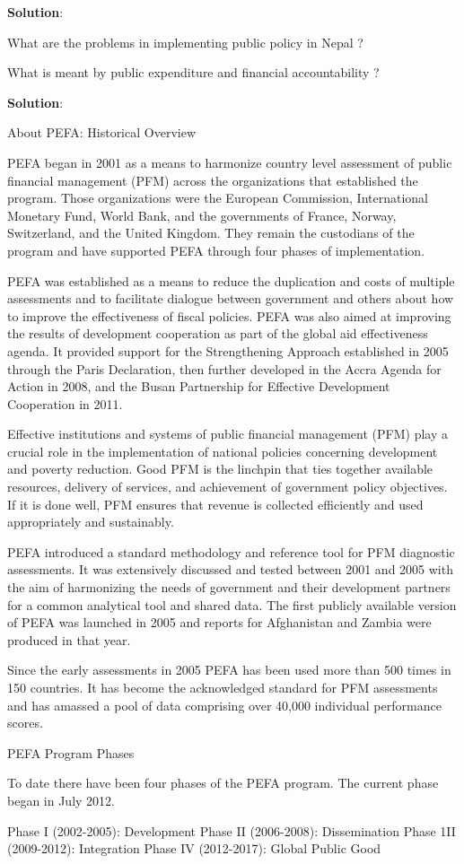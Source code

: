 \documentclass[
  openany]{book}
\newcommand{\question}{\item}
\newenvironment{solution}{ {\bfseries Solution}:}{}
\begin{document}
\begin{questions}
\begin{solution}
\end{solution}

\question What are the problems in implementing public policy in Nepal ?

\question What is meant by public expenditure and financial accountability ?

\begin{solution}

About PEFA: Historical Overview

PEFA began in 2001 as a means to harmonize country level assessment of public financial management (PFM) across the organizations that established the program. Those organizations were the European Commission, International Monetary Fund, World Bank, and the governments of France, Norway, Switzerland, and the United Kingdom. They remain the custodians of the program and have supported PEFA through four phases of implementation.

PEFA was established as a means to reduce the duplication and costs of multiple assessments and to facilitate dialogue between government and others about how to improve the effectiveness of fiscal policies. PEFA was also aimed at improving the results of development cooperation as part of the global aid effectiveness agenda. It provided support for the Strengthening Approach established in 2005 through the Paris Declaration, then further developed in the Accra Agenda for Action in 2008, and the Busan Partnership for Effective Development Cooperation in 2011.

Effective institutions and systems of public financial management (PFM) play a crucial role in the implementation of national policies concerning development and poverty reduction. Good PFM is the linchpin that ties together available resources, delivery of services, and achievement of government policy objectives. If it is done well, PFM ensures that revenue is collected efficiently and used appropriately and sustainably.

PEFA introduced a standard methodology and reference tool for PFM diagnostic assessments. It was extensively discussed and tested between 2001 and 2005 with the aim of harmonizing the needs of government and their development partners for a common analytical tool and shared data. The first publicly available version of PEFA was launched in 2005 and reports for Afghanistan and Zambia were produced in that year. 

Since the early assessments in 2005 PEFA has been used more than 500 times in 150 countries. It has become the acknowledged standard for PFM assessments and has amassed a pool of data comprising over 40,000 individual performance scores.

PEFA Program Phases

To date there have been four phases of the PEFA program. The current phase began in July 2012.

Phase I (2002-2005): Development
Phase II (2006-2008): Dissemination
Phase 1II (2009-2012): Integration
Phase IV (2012-2017): Global Public Good

\end{solution}

\end{questions}
\end{document}
